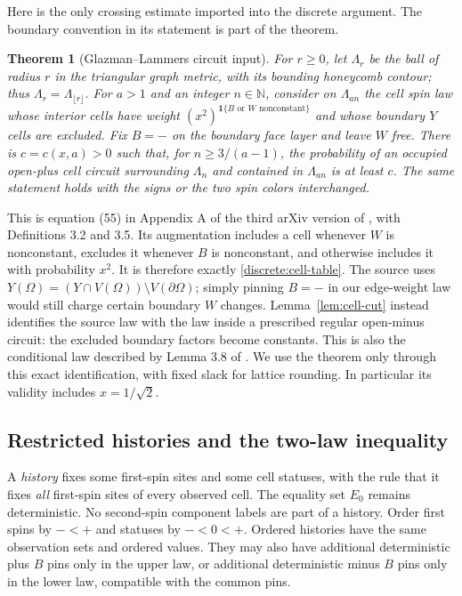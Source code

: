 \documentclass[11pt]{article}
\newtheorem{theorem}{Theorem}[section]
\theoremstyle{definition}
\theoremstyle{remark}
\numberwithin{equation}{section}
\begin{document}
\begin{samepage}
Here is the only crossing estimate imported into the discrete argument.
The boundary convention in its statement is part of the theorem.

\begin{theorem}[Glazman--Lammers circuit input]\label{thm:circuit-input}
For $r\ge0$, let $\Lambda_r$ be the ball of radius $r$ in the triangular
graph metric, with its bounding honeycomb contour; thus
$\Lambda_r=\Lambda_{\lfloor r\rfloor}$. For $a>1$ and an integer
$n\in\mathbb N$, consider on
$\Lambda_{an}$ the cell spin law whose
interior cells have weight $(x^2)^{\mathbf 1\{B\text{ or }W\text{ nonconstant}\}}$
and whose boundary $Y$ cells are excluded. Fix $B=-$ on the boundary face
layer and leave $W$ free. There is $c=c(x,a)>0$ such
that, for $n\ge 3/(a-1)$, the probability of an occupied open-plus cell
circuit surrounding $\Lambda_n$ and contained in $\Lambda_{an}$ is at
least $c$. The same statement holds with the signs or the two spin colors
interchanged.
\end{theorem}
\end{samepage}

This is equation (55) in Appendix A of the third arXiv version of
\cite{GL2025}, with Definitions 3.2 and 3.5. Its augmentation includes a
cell whenever $W$ is nonconstant, excludes it whenever $B$ is nonconstant,
and otherwise includes it with probability $x^2$. It is therefore exactly
\eqref{discrete:cell-table}. The source uses
$Y(\Omega)=(Y\cap V(\Omega))\setminus V(\partial\Omega)$; simply pinning
$B=-$ in our edge-weight law would still charge certain boundary $W$
changes. Lemma~\ref{lem:cell-cut} instead identifies the source law with
the law inside a prescribed regular open-minus circuit: the excluded
boundary factors become constants. This is also the conditional law
described by Lemma 3.8 of \cite{GL2025}. We use the theorem only through
this exact identification, with fixed slack for lattice rounding. In
particular its validity includes $x=1/\sqrt2$.

\subsection{Restricted histories and the two-law inequality}

A \emph{history} fixes some first-spin sites and some cell statuses, with
the rule that it fixes \emph{all} first-spin sites of every observed cell.
The equality set $E_0$ remains deterministic. No second-spin component
labels are part of a history. Order first spins by $-<+$ and statuses by
$-<0<+$. Ordered histories have the same observation sets and ordered
values. They may also have additional deterministic plus $B$ pins only in
the upper law, or additional deterministic minus $B$ pins only in the
lower law, compatible with the common pins.
\end{document}
